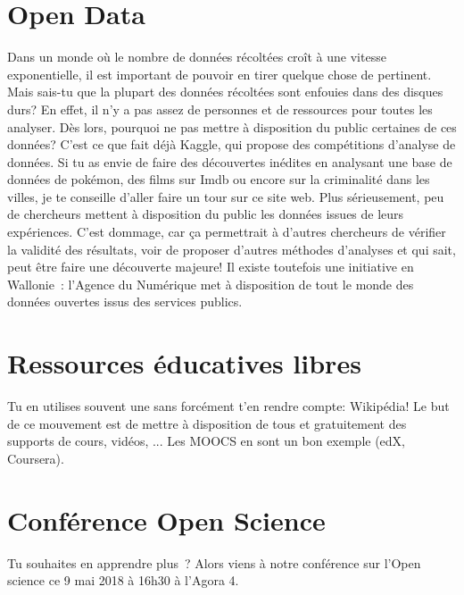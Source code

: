 \documentclass{../fiche}
\begin{document}
\section{Open Data}
Dans un monde où le nombre de données récoltées croît à une vitesse exponentielle, il est important de pouvoir en tirer quelque chose de pertinent. Mais sais-tu que la plupart des données récoltées sont enfouies dans des disques durs? En effet, il n'y a pas assez de personnes et de ressources pour toutes les analyser. Dès lors, pourquoi ne pas mettre à disposition du public certaines de ces données? C'est ce que fait déjà Kaggle, qui propose des compétitions d'analyse de données. Si tu as envie de faire des découvertes inédites en analysant une base de données de pokémon, des films sur Imdb ou encore sur la criminalité dans les villes, je te conseille d'aller faire un tour sur ce site web. Plus sérieusement, peu de chercheurs mettent à disposition du public les données issues de leurs expériences. C'est dommage, car ça permettrait à d'autres chercheurs de vérifier la validité des résultats, voir de proposer d'autres méthodes d'analyses et qui sait, peut être faire une découverte majeure! Il existe toutefois une initiative en Wallonie : l’Agence du Numérique met à disposition de tout le monde des données ouvertes issus des services publics.

\section{Ressources éducatives libres}
Tu en utilises souvent une sans forcément t'en rendre compte: Wikipédia! Le but de ce mouvement est de mettre à disposition de tous et gratuitement des supports de cours, vidéos, ... Les MOOCS en sont un bon exemple (edX, Coursera). 

\section{Conférence Open Science}
Tu souhaites en apprendre plus ? Alors viens à notre conférence sur l’Open science ce 9 mai 2018 à 16h30 à l’Agora 4.
\end{document}
